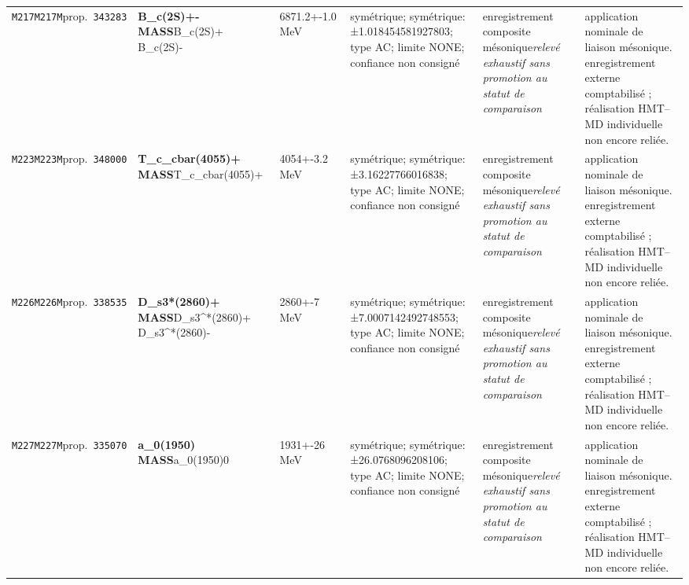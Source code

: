 \begin{landscape}
\begin{longtable}{L{1.85cm}L{4.45cm}L{2.35cm}L{4.05cm}L{3.35cm}L{7.15cm}}
\texttt{M217}\newline \texttt{M217M}\newline prop.\ \texttt{343283} & \textbf{B\_\allowbreak{}c(2S)+- MASS}\newline B\_\allowbreak{}c(2S)+ \textbar{}\allowbreak{} B\_\allowbreak{}c(2S)- & 6871.2+-1.0\,MeV & symétrique; symétrique: ±1.018454581927803; type AC; limite NONE; confiance non consigné & enregistrement composite mésonique\newline \emph{relevé exhaustif sans promotion au statut de comparaison} & application nominale de liaison mésonique. enregistrement externe comptabilisé ; réalisation HMT--MD individuelle non encore reliée. \\
\texttt{M223}\newline \texttt{M223M}\newline prop.\ \texttt{348000} & \textbf{T\_\allowbreak{}c\_\allowbreak{}cbar(4055)+ MASS}\newline T\_\allowbreak{}c\_\allowbreak{}cbar(4055)+ & 4054+-3.2\,MeV & symétrique; symétrique: ±3.16227766016838; type AC; limite NONE; confiance non consigné & enregistrement composite mésonique\newline \emph{relevé exhaustif sans promotion au statut de comparaison} & application nominale de liaison mésonique. enregistrement externe comptabilisé ; réalisation HMT--MD individuelle non encore reliée. \\
\texttt{M226}\newline \texttt{M226M}\newline prop.\ \texttt{338535} & \textbf{D\_\allowbreak{}s3*(2860)+ MASS}\newline D\_\allowbreak{}s3\textasciicircum{}*(2860)+ \textbar{}\allowbreak{} D\_\allowbreak{}s3\textasciicircum{}*(2860)- & 2860+-7\,MeV & symétrique; symétrique: ±7.0007142492748553; type AC; limite NONE; confiance non consigné & enregistrement composite mésonique\newline \emph{relevé exhaustif sans promotion au statut de comparaison} & application nominale de liaison mésonique. enregistrement externe comptabilisé ; réalisation HMT--MD individuelle non encore reliée. \\
\texttt{M227}\newline \texttt{M227M}\newline prop.\ \texttt{335070} & \textbf{a\_\allowbreak{}0(1950) MASS}\newline a\_\allowbreak{}0(1950)0 & 1931+-26\,MeV & symétrique; symétrique: ±26.0768096208106; type AC; limite NONE; confiance non consigné & enregistrement composite mésonique\newline \emph{relevé exhaustif sans promotion au statut de comparaison} & application nominale de liaison mésonique. enregistrement externe comptabilisé ; réalisation HMT--MD individuelle non encore reliée. \\

\end{longtable}
\end{landscape}
